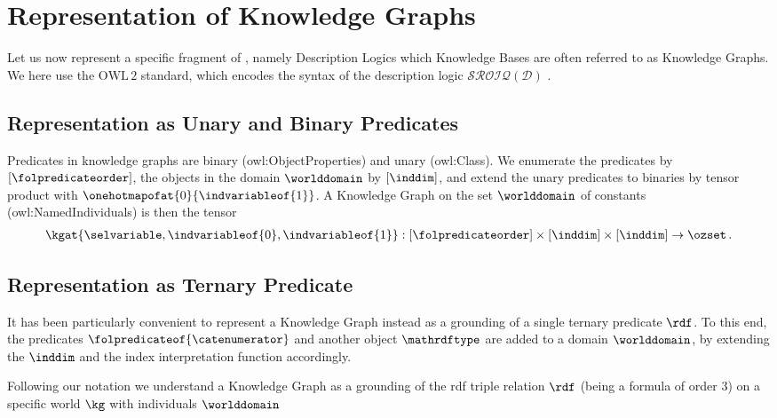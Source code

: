 \section{Representation of Knowledge Graphs}\label{sec:kgRepresentation}


Let us now represent a specific fragment of \firstOrderLogic{}, namely Description Logics which Knowledge Bases are often referred to as Knowledge Graphs.
We here use the $\mathrm{OWL\,2}$ standard, which encodes the syntax of the description logic $\mathcal{SROIQ(D)}$ \cite{rudolph_foundations_2011}.

\subsection{Representation as Unary and Binary Predicates}

Predicates in knowledge graphs are binary (owl:ObjectProperties) and unary (owl:Class).
We enumerate the predicates by $[\folpredicateorder]$, the objects in the domain $\worlddomain$ by $[\inddim]$, and extend the unary predicates to binaries by tensor product with $\onehotmapofat{0}{\indvariableof{1}}$.
A Knowledge Graph on the set $\worlddomain$ of constants (owl:NamedIndividuals) is then the tensor
\begin{align*}
    \kgat{\selvariable,\indvariableof{0},\indvariableof{1}} : [\folpredicateorder] \times [\inddim] \times [\inddim] \rightarrow \ozset \, .
\end{align*}


\subsection{Representation as Ternary Predicate}\label{subsec:knowledgeGraphTernaryRep}

It has been particularly convenient to represent a Knowledge Graph instead as a grounding of a single ternary predicate $\rdf$.
To this end, the predicates $\folpredicateof{\catenumerator}$ and another object $\mathrdftype$ are added to a domain $\worlddomain$, by extending the $\inddim$ and the index interpretation function accordingly.


Following our notation we understand a Knowledge Graph as a grounding of the rdf triple relation $\rdf$ (being a formula of order 3) on a specific world $\kg$ with individuals $\worlddomain$

